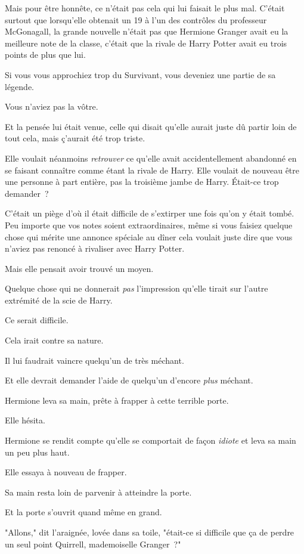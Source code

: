 Mais pour être honnête, ce n'était pas cela qui lui faisait le plus mal. C'était surtout que lorsqu'elle obtenait un 19 à l'un des contrôles du professeur McGonagall, la grande nouvelle n'était pas que Hermione Granger avait eu la meilleure note de la classe, c'était que la rivale de Harry Potter avait eu trois points de plus que lui.

Si vous vous approchiez trop du Survivant, vous deveniez une partie de sa légende.

Vous n'aviez pas la vôtre.

Et la pensée lui était venue, celle qui disait qu'elle aurait juste dû partir loin de tout cela, mais ç'aurait été trop triste.

Elle voulait néanmoins \emph{retrouver} ce qu'elle avait accidentellement abandonné en se faisant connaître comme étant la rivale de Harry. Elle voulait de nouveau être une personne à part entière, pas la troisième jambe de Harry. Était-ce trop demander~?

C'était un piège d'où il était difficile de s'extirper une fois qu'on y était tombé. Peu importe que vos notes soient extraordinaires, même si vous faisiez quelque chose qui mérite une annonce spéciale au dîner cela voulait juste dire que vous n'aviez pas renoncé à rivaliser avec Harry Potter.

Mais elle pensait avoir trouvé un moyen.

Quelque chose qui ne donnerait \emph{pas} l'impression qu'elle tirait sur l'autre extrémité de la scie de Harry.

Ce serait difficile.

Cela irait contre sa nature.

Il lui faudrait vaincre quelqu'un de très méchant.

Et elle devrait demander l'aide de quelqu'un d'encore \emph{plus} méchant.

Hermione leva sa main, prête à frapper à cette terrible porte.

Elle hésita.

Hermione se rendit compte qu'elle se comportait de façon \emph{idiote} et leva sa main un peu plus haut.

Elle essaya à nouveau de frapper.

Sa main resta loin de parvenir à atteindre la porte.

Et la porte s'ouvrit quand même en grand.

"Allons," dit l'araignée, lovée dans sa toile, "était-ce si difficile que ça de perdre un seul point Quirrell, mademoiselle Granger~?"

